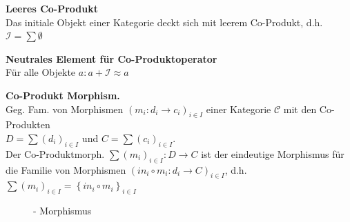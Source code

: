 \begin{multicols}{2}
\textbf{ Leeres Co-Produkt} \\
Das initiale Objekt einer Kategorie deckt sich mit leerem Co-Produkt, d.h. $\mathcal{I} = \sum \emptyset$

\textbf{ Neutrales Element für Co-Produktoperator} \\
Für alle Objekte $a: a + \mathcal{I} \approx a$

\textbf{ Co-Produkt Morphism.} \\
Geg. Fam. von Morphismen $\left(m_{i}:d_{i}\rightarrow c_{i}\right)_{i\in I}$ einer Kategorie $\mathcal{C}$ mit den Co-Produkten \\ $D=\sum(d_{i})_{i\in I}$
und $C=\sum(c_{i})_{i\in I}$. \\ Der Co-Produktmorph. $\sum(m_{i})_{i\in I}:D\rightarrow C$
ist der eindeutige Morphismus für die Familie von Morphismen
$\left(in_{i}\circ m_{i}:d_i \rightarrow C\right)_{i\in I}$,
d.h. $\sum(m_{i})_{i\in I}=\left \{in_{i}\circ m_{i}\right\} _{i\in I}$ 




\end{multicols}

\begin{figure}[h]
\centering
{} \qquad\qquad\qquad
{}
\caption{- Morphismus}
\end{figure}

\newpage 


